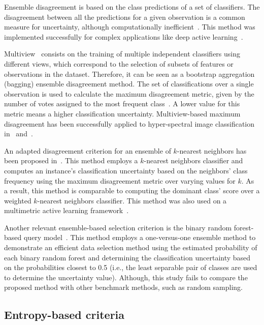\documentclass[parskip=full]{scrartcl}
\begin{document}
Ensemble disagreement is based on the class predictions of a set of classifiers. The disagreement
between all the predictions for a given observation is a common measure for uncertainty, although
computationally inefficient~\cite{Ruzicka2020,Pasolli2016}. This method was implemented successfully
for complex applications like deep active learning~\cite{Ruzicka2020}.

Multiview~\cite{Muslea2006} consists on the training of multiple independent classifiers using
different views, which correspond to the selection of subsets of features or observations in the
dataset. Therefore, it can be seen as a bootstrap aggregation (bagging) ensemble disagreement
method. The set of classifications over a single observation is used to calculate the maximum
disagreement metric, given by the number of votes assigned to the most frequent
class~\cite{Shrivastava2021}. A lower value for this metric means a higher classification
uncertainty. Multiview-based maximum disagreement has been successfully applied to hyper-spectral
image classification in~\cite{Di2012} and~\cite{Zhou2014}.

An adapted disagreement criterion for an ensemble of $k$-nearest neighbors has been proposed
in~\cite{Pasolli2016}. This method employs a $k$-nearest neighbors classifier and computes an
instance's classification uncertainty based on the neighbors' class frequency using the maximum
disagreement metric over varying values for $k$. As a result, this method is comparable to computing
the dominant class' score over a weighted $k$-nearest neighbors classifier. This method was also
used on a multimetric active learning framework~\cite{Zhang2016}.

Another relevant ensemble-based selection criterion is the binary random forest-based query
model~\cite{Su2020}. This method employs a one-versus-one ensemble method to demonstrate an
efficient data selection method using the estimated probability of each binary random forest and
determining the classification uncertainty based on the probabilities closest to 0.5 (i.e., the
least separable pair of classes are used to determine the uncertainty value). Although, this study
fails to compare the proposed method with other benchmark methods, such as random sampling.

\subsection{Entropy-based criteria}
\end{document}
